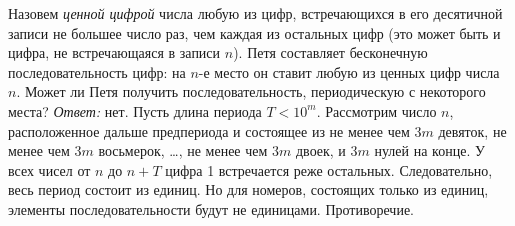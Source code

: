 \problem
Назовем \emph{ценной цифрой} числа любую из цифр, встречающихся в его
десятичной записи не большее число раз, чем каждая из остальных цифр
(это может быть и цифра, не встречающаяся в записи $n$).
Петя составляет бесконечную последовательность цифр: на $n$-е место он ставит
любую из ценных цифр числа $n$.
Может ли Петя получить последовательность, периодическую с некоторого места?
\solution
\emph{Ответ:} нет.
Пусть длина периода $T < 10^m$.
Рассмотрим число $n$, расположенное дальше предпериода и состоящее из не менее
чем $3m$ девяток, не менее чем $3m$ восьмерок, \ldots, не менее чем $3m$ двоек,
и $3m$ нулей на конце.
У всех чисел от $n$ до  $n + T$ цифра 1 встречается реже остальных.
Следовательно, весь период состоит из единиц.
Но для номеров, состоящих только из единиц, элементы последовательности
будут не единицами.
Противоречие.
\endproblem
